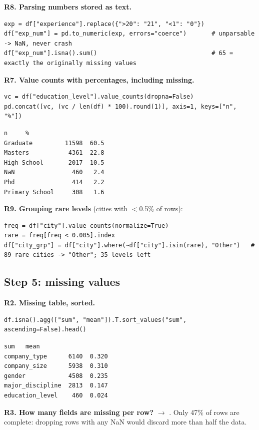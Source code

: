 \textbf{R8. Parsing numbers stored as text.}
\begin{lstlisting}
exp = df["experience"].replace({">20": "21", "<1": "0"})
df["exp_num"] = pd.to_numeric(exp, errors="coerce")       # unparsable -> NaN, never crash
df["exp_num"].isna().sum()                                # 65 = exactly the originally missing values
\end{lstlisting}
\textbf{R7. Value counts with percentages, including missing.}
\begin{lstlisting}
vc = df["education_level"].value_counts(dropna=False)
pd.concat([vc, (vc / len(df) * 100).round(1)], axis=1, keys=["n", "%"])
\end{lstlisting}
\outlabel
\begin{lstlisting}[style=out]
                     n     %
Graduate         11598  60.5
Masters           4361  22.8
High School       2017  10.5
NaN                460   2.4
Phd                414   2.2
Primary School     308   1.6
\end{lstlisting}
\textbf{R9. Grouping rare levels} (cities with $<$0.5\% of rows):
\begin{lstlisting}
freq = df["city"].value_counts(normalize=True)
rare = freq[freq < 0.005].index
df["city_grp"] = df["city"].where(~df["city"].isin(rare), "Other")   # 89 rare cities -> "Other"; 35 levels left
\end{lstlisting}

\subsection{Step 5: missing values}
\textbf{R2. Missing table, sorted.}
\begin{lstlisting}
df.isna().agg(["sum", "mean"]).T.sort_values("sum", ascending=False).head()
\end{lstlisting}
\outlabel
\begin{lstlisting}[style=out]
                     sum   mean
company_type      6140  0.320
company_size      5938  0.310
gender            4508  0.235
major_discipline  2813  0.147
education_level    460  0.024
\end{lstlisting}
\textbf{R3. How many fields are missing per row?}  $\to$ . Only 47\% of rows are complete: dropping rows with any NaN would discard more than half the data.

